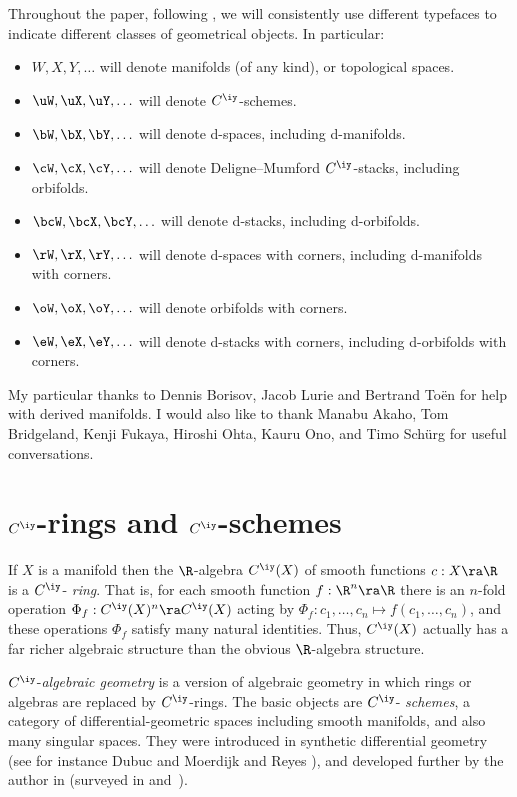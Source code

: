 \documentclass{article}
\begin{document}
Throughout the paper, following \cite{Joyc6}, we will consistently
use different typefaces to indicate different classes of geometrical
objects. In particular:
\begin{itemize}
\setlength{\itemsep}{0pt}
\setlength{\parsep}{0pt}
\item $W,X,Y,\ldots$ will denote manifolds (of any kind), or
topological spaces.
\item $\uW,\uX,\uY,\ldots$ will denote $C^\iy$-schemes.
\item $\bW,\bX,\bY,\ldots$ will denote d-spaces, including d-manifolds.
\item $\cW,\cX,\cY,\ldots$ will denote Deligne--Mumford
$C^\iy$-stacks, including orbifolds.
\item $\bcW,\bcX,\bcY,\ldots$ will denote d-stacks, including d-orbifolds.
\item $\rW,\rX,\rY,\ldots$ will denote d-spaces with corners,
including d-manifolds with corners.
\item $\oW,\oX,\oY,\ldots$ will denote orbifolds with corners.
\item $\eW,\eX,\eY,\ldots$ will denote d-stacks with corners,
including d-orbifolds with corners.
\end{itemize}

\smallskip

 My particular thanks to Dennis
Borisov, Jacob Lurie and Bertrand To\"en for help with derived
manifolds. I would also like to thank Manabu Akaho, Tom Bridgeland,
Kenji Fukaya, Hiroshi Ohta, Kauru Ono, and Timo Sch\"urg for useful
conversations.

\section{$C^\iy$-rings and $C^\iy$-schemes}
\label{ds2}

If $X$ is a manifold then the $\R$-algebra $C^\iy(X)$ of smooth
functions $c:X\ra\R$ is a $C^\iy$-{\it
ring}. That is, for each smooth function
$f:\R^n\ra\R$ there is an $n$-fold operation $\Phi_f:C^\iy(X)^n\ra
C^\iy(X)$ acting by $\Phi_f:c_1,\ldots,c_n\mapsto
f(c_1,\ldots,c_n)$, and these operations $\Phi_f$ satisfy many
natural identities. Thus, $C^\iy(X)$ actually has a far richer
algebraic structure than the obvious $\R$-algebra structure.

$C^\iy$-{\it algebraic geometry\/} is a version of algebraic
geometry in which rings or algebras are replaced by $C^\iy$-rings.
The basic objects are $C^\iy$-{\it
schemes}, a category of
differential-geometric spaces including smooth manifolds, and also
many singular spaces. They were introduced in synthetic differential
geometry (see for instance Dubuc
\cite{Dubu} and Moerdijk and Reyes \cite{MoRe}), and developed
further by the author in \cite{Joyc4} (surveyed in \cite{Joyc5}
and~\cite[App.~B]{Joyc6}).
\end{document}
